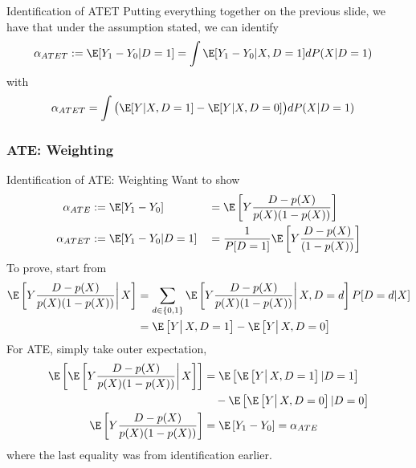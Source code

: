 \documentclass[aspectratio=169, handout]{beamer}
\begin{document}
{\footnotesize
\begin{frame}{Identification of ATET}
Putting everything together on the previous slide, we have that under
the assumption stated, we can identify
\begin{align*}
  \alpha_{ATET}
  &:=
  \E[Y_1-Y_0|D=1]
  =
  \int
  \E[Y_1-Y_0|X,D=1]
  dP(X|D=1)
\end{align*}
with
\begin{align*}
  \alpha_{ATET}
  &=
  \int
  \big(
  \E[Y|X,D=1]
  -
  \E[Y|X,D=0]
  \big)
  dP(X|D=1)
\end{align*}

\end{frame}
}




\subsubsection{ATE: Weighting}

{\footnotesize
\begin{frame}{Identification of ATE: Weighting}
Want to show
\begin{align*}
  \alpha_{ATE}
  &:=
  \E[Y_1-Y_0]
  &&=
  \E\left[
    Y
    \frac{D-p(X)}{p(X)(1-p(X))}
  \right]
  \\
  \alpha_{ATET}
  &:=
  \E[Y_1-Y_0|D=1]
  &&=
  \frac{1}{P[D=1]}
  \E\left[
    Y
    \frac{D-p(X)}{(1-p(X))}
  \right]
\end{align*}
To prove, start from
\begin{align*}
  \E\left[
    Y
    \frac{D-p(X)}{p(X)(1-p(X))}
    \bigg|
    \,X
  \right]
  &=
  \sum_{d\in \{0,1\}}
  \E\left[
    Y
    \frac{D-p(X)}{p(X)(1-p(X))}
    \bigg|
    \,X,D=d
  \right]
  P[D=d|X]
  \\
  &=
  \E\left[
    Y
    \big|
    \,X,D=1
  \right]
  -
  \E\left[
    Y
    \big|
    \,X,D=0
  \right]
\end{align*}
For ATE, simply take outer expectation,
\begin{align*}
  \E\left[
  \E\left[
    Y
    \frac{D-p(X)}{p(X)(1-p(X))}
    \bigg|
    \,X
  \right]
  \right]
  &=
  \E\left[
  \E\left[
    Y
    \big|
    \,X,D=1
  \right]
  |D=1
  \right]
  \\
  &\quad
  -
  \E\left[
  \E\left[
    Y
    \big|
    \,X,D=0
  \right]
  |D=0
  \right]
  \\
  \E\left[
    Y
    \frac{D-p(X)}{p(X)(1-p(X))}
  \right]
  &=
  \E\left[
    Y_1-Y_0
  \right]
  =
  \alpha_{ATE}
\end{align*}
where the last equality was from identification earlier.
\end{frame}
}
\end{document}
